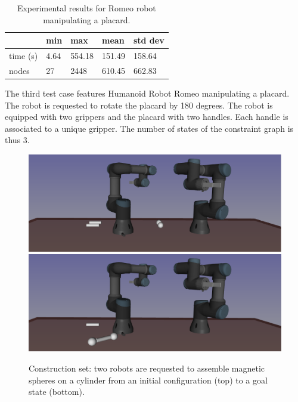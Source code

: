 \begin{table}
  \begin{center}
  \begin{tabular}{|l|l|l|l|l|}
    \hline
    & min & max & mean & std dev \\
    \hline
    time (s) & 4.64 & 554.18 & 151.49 & 158.64 \\
    nodes & 27 &  2448 & 610.45 & 662.83 \\
    \hline
  \end{tabular}
  \end{center}
  \caption{Experimental results for Romeo robot manipulating a placard.}
  \label{tab:romeo-placard}
\end{table}

The third test case features Humanoid Robot Romeo manipulating a placard. The
robot is requested to rotate the placard by 180 degrees. The robot is equipped
with two grippers and the placard with two handles. Each handle is associated
to a unique gripper. The number of states of the constraint graph is thus 3.

\begin{figure}
  \begin{center}
    \includegraphics[width=\linewidth]{figures/construction-set-init.png}
    \includegraphics[width=\linewidth]{figures/construction-set-goal.png}    
  \end{center}
  \caption{Construction set: two robots are requested to assemble magnetic
    spheres on a cylinder from an initial configuration (top) to a goal state
    (bottom).}
  \label{fig:construction-set}
\end{figure}


